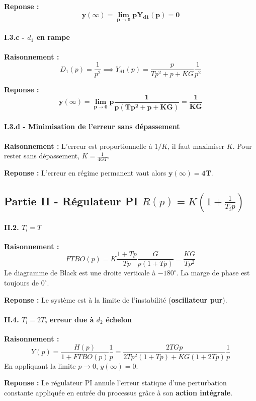 \documentclass[11pt,a4paper]{article}
\begin{document}
\textbf{Reponse :} 
$$ \mathbf{y(\infty) = \lim_{p\to0} p Y_{d1}(p) = 0} $$

\paragraph{I.3.c - $d_1$ en rampe}
\textbf{Raisonnement :} 
$$ D_1(p) = \frac{1}{p^2} \implies Y_{d1}(p) = \frac{p}{Tp^2+p+KG} \frac{1}{p^2} $$

\textbf{Reponse :} 
$$ \mathbf{y(\infty) = \lim_{p\to0} p \frac{1}{p(Tp^2+p+KG)} = \frac{1}{KG}} $$

\paragraph{I.3.d - Minimisation de l'erreur sans dépassement}
\textbf{Raisonnement :} L'erreur est proportionnelle à $1/K$, il faut maximiser $K$. Pour rester sans dépassement, $K = \frac{1}{4GT}$.

\textbf{Reponse :} L'erreur en régime permanent vaut alors $\mathbf{y(\infty) = 4T}$.

\subsection*{Partie II - Régulateur PI $R(p)=K(1+\frac{1}{T_ip})$}

\paragraph{II.2. $T_i = T$}
\textbf{Raisonnement :} 
$$ FTBO(p) = K\frac{1+Tp}{Tp} \frac{G}{p(1+Tp)} = \frac{KG}{Tp^2} $$
Le diagramme de Black est une droite verticale à $-180^\circ$. La marge de phase est toujours de $0^\circ$.

\textbf{Reponse :} Le système est à la limite de l'instabilité (\textbf{oscillateur pur}).

\paragraph{II.4. $T_i = 2T$, erreur due à $d_2$ échelon}
\textbf{Raisonnement :} 
$$ Y(p) = \frac{H(p)}{1+FTBO(p)} \frac{1}{p} = \frac{2TGp}{2Tp^2(1+Tp)+KG(1+2Tp)}\frac{1}{p} $$
En appliquant la limite $p \to 0$, $y(\infty) = 0$.

\textbf{Reponse :} Le régulateur PI annule l'erreur statique d'une perturbation constante appliquée en entrée du processus grâce à son \textbf{action intégrale}.

\hrulefill
\end{document}
